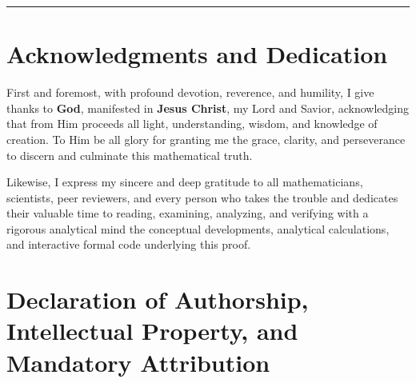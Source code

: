 \documentclass[11pt,a4paper]{article}
\theoremstyle{definition}
\theoremstyle{remark}
\begin{document}
\tableofcontents

\vspace{1.5em}
\hrule
\vspace{1.5em}

\section*{Acknowledgments and Dedication}

First and foremost, with profound devotion, reverence, and humility, I give thanks to \textbf{God}, manifested in \textbf{Jesus Christ}, my Lord and Savior, acknowledging that from Him proceeds all light, understanding, wisdom, and knowledge of creation. To Him be all glory for granting me the grace, clarity, and perseverance to discern and culminate this mathematical truth.

Likewise, I express my sincere and deep gratitude to all mathematicians, scientists, peer reviewers, and every person who takes the trouble and dedicates their valuable time to reading, examining, analyzing, and verifying with a rigorous analytical mind the conceptual developments, analytical calculations, and interactive formal code underlying this proof.

\vspace{1.5em}

\section*{Declaration of Authorship, Intellectual Property, and Mandatory Attribution}
\end{document}
